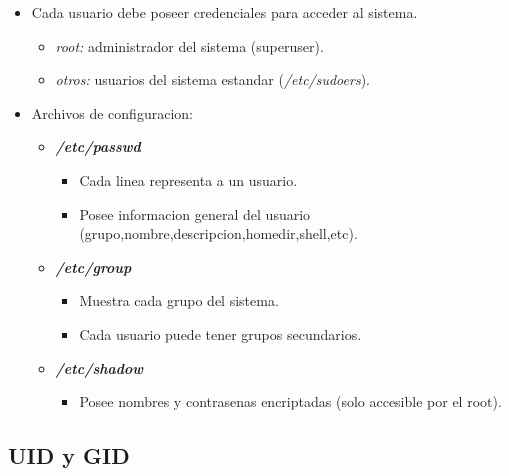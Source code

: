 \documentclass[11pt]{article}
\begin{document}
\begin{itemize}
    \item Cada usuario debe poseer credenciales para acceder al sistema.
        \begin{itemize}
            \item \textit{root:} administrador del sistema (superuser).
            \item \textit{otros:} usuarios del sistema estandar (\textit{/etc/sudoers}).
        \end{itemize}
    \item Archivos de configuracion:
        \begin{itemize}
            \item \textbf{\textit{/etc/passwd}}
                \begin{itemize}
                    \item Cada linea representa a un usuario.
                    \item Posee informacion general del usuario (grupo,nombre,descripcion,homedir,shell,etc).
                \end{itemize}
            \item \textbf{\textit{/etc/group}}
                \begin{itemize}
                    \item Muestra cada grupo del sistema.
                    \item Cada usuario puede tener grupos secundarios.
                \end{itemize}
            \item \textbf{\textit{/etc/shadow}}
                \begin{itemize}
                    \item Posee nombres y contrasenas encriptadas (solo accesible por el root).
                \end{itemize}
        \end{itemize}
\end{itemize}

\subsection{UID y GID}
\end{document}
